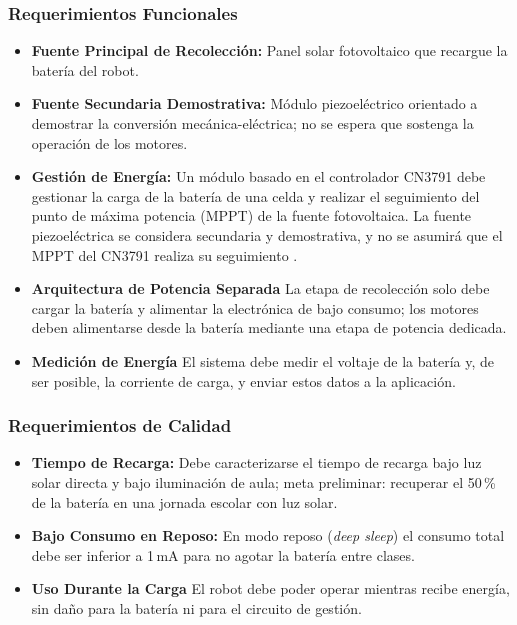 \documentclass[11pt]{article}
\begin{document}
\subsubsection{Requerimientos Funcionales}
\begin{itemize}
  \item \textbf{Fuente Principal de Recolección:} Panel solar fotovoltaico que recargue la batería del robot.
  \item \textbf{Fuente Secundaria Demostrativa:} Módulo piezoeléctrico orientado a demostrar la conversión mecánica-eléctrica; no se espera que sostenga la operación de los motores.
  \item \textbf{Gestión de Energía:} Un módulo basado en el controlador CN3791 debe
gestionar la carga de la batería de una celda y realizar el seguimiento del
punto de máxima potencia (MPPT) de la fuente fotovoltaica. La fuente
piezoeléctrica se considera secundaria y demostrativa, y no se asumirá que el
MPPT del CN3791 realiza su seguimiento \cite{consonance_cn3791}.
  \item \textbf{Arquitectura de Potencia Separada}  La etapa de recolección solo debe cargar la batería y alimentar la electrónica de bajo consumo; los motores deben alimentarse desde la batería mediante una etapa de potencia dedicada.
  \item \textbf{Medición de Energía}  El sistema debe medir el voltaje de la batería y, de ser posible, la corriente de carga, y enviar estos datos a la aplicación.
\end{itemize}
 
\subsubsection{Requerimientos de Calidad}
\begin{itemize}
  \item \textbf{Tiempo de Recarga:} Debe caracterizarse el tiempo de recarga bajo luz solar directa y bajo iluminación de aula; meta preliminar: recuperar el 50\,\% de la batería en una jornada escolar con luz solar.
  \item \textbf{Bajo Consumo en Reposo:} En modo reposo (\textit{deep sleep}) el consumo total debe ser inferior a 1\,mA para no agotar la batería entre clases.
  \item \textbf{Uso Durante la Carga} El robot debe poder operar mientras recibe energía, sin daño para la batería ni para el circuito de gestión.
\end{itemize}
 
\end{document}
